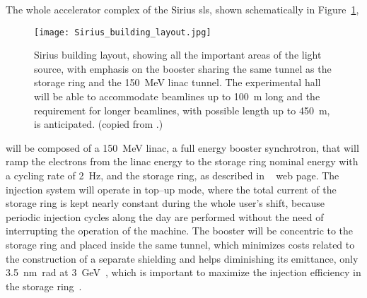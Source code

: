     The whole accelerator complex of the Sirius \gls{sls}, shown schematically in Figure~\ref{fig:accelerator_complex},
    \begin{figure}
        \centering
        \texttt{[image: Sirius\_building\_layout.jpg]}
        \caption[Sirius building layout.]{Sirius building layout, showing all the important areas of the light source, with emphasis on the booster sharing the same tunnel as the storage ring and the \SI{150}{\mega\electronvolt} \gls{linac} tunnel. The experimental hall will be able to accommodate beamlines up to \SI{100}{\meter} long and the requirement for longer beamlines, with possible length up to \SI{450}{\meter}, is anticipated. (copied from .)}
        \label{fig:accelerator_complex}
    \end{figure}
    will be composed of a \SI{150}{\mega\electronvolt} \gls{linac}, a full energy booster synchrotron, that will ramp the electrons from the \gls{linac} energy to the storage ring nominal energy with a cycling rate of \SI{2}{\hertz}, and the storage ring, as described in ~ web page. The injection system will operate in top--up mode, where the total current of the storage ring is kept nearly constant during the whole user's shift, because periodic injection cycles along the day are performed without the need of interrupting the operation of the machine. The booster will be concentric to the storage ring and placed inside the same tunnel, which minimizes costs related to the construction of a separate shielding and helps diminishing its emittance, only \SI{3.5}{\nano\meter\radian} at \SI{3}{\giga\electronvolt}~\cite{Sa2014a}, which is important to maximize the injection efficiency in the storage ring~\cite{Liu2016a}.

